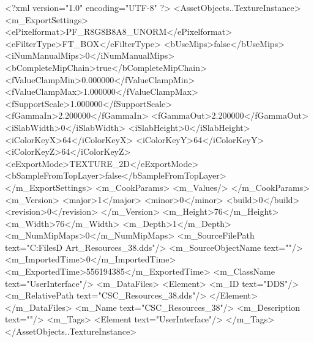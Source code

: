 <?xml version="1.0" encoding="UTF-8" ?>
<AssetObjects..TextureInstance>
	<m_ExportSettings>
		<ePixelformat>PF_R8G8B8A8_UNORM</ePixelformat>
		<eFilterType>FT_BOX</eFilterType>
		<bUseMips>false</bUseMips>
		<iNumManualMips>0</iNumManualMips>
		<bCompleteMipChain>true</bCompleteMipChain>
		<fValueClampMin>0.000000</fValueClampMin>
		<fValueClampMax>1.000000</fValueClampMax>
		<fSupportScale>1.000000</fSupportScale>
		<fGammaIn>2.200000</fGammaIn>
		<fGammaOut>2.200000</fGammaOut>
		<iSlabWidth>0</iSlabWidth>
		<iSlabHeight>0</iSlabHeight>
		<iColorKeyX>64</iColorKeyX>
		<iColorKeyY>64</iColorKeyY>
		<iColorKeyZ>64</iColorKeyZ>
		<eExportMode>TEXTURE_2D</eExportMode>
		<bSampleFromTopLayer>false</bSampleFromTopLayer>
	</m_ExportSettings>
	<m_CookParams>
		<m_Values/>
	</m_CookParams>
	<m_Version>
		<major>1</major>
		<minor>0</minor>
		<build>0</build>
		<revision>0</revision>
	</m_Version>
	<m_Height>76</m_Height>
	<m_Width>76</m_Width>
	<m_Depth>1</m_Depth>
	<m_NumMipMaps>0</m_NumMipMaps>
	<m_SourceFilePath text="C:\Users\Shadow\Desktop\Working Files\2D Art\Resources\CSC_Resources_38.dds"/>
	<m_SourceObjectName text=""/>
	<m_ImportedTime>0</m_ImportedTime>
	<m_ExportedTime>556194385</m_ExportedTime>
	<m_ClassName text="UserInterface"/>
	<m_DataFiles>
		<Element>
			<m_ID text="DDS"/>
			<m_RelativePath text="CSC_Resources_38.dds"/>
		</Element>
	</m_DataFiles>
	<m_Name text="CSC_Resources_38"/>
	<m_Description text=""/>
	<m_Tags>
		<Element text="UserInterface"/>
	</m_Tags>
</AssetObjects..TextureInstance>
